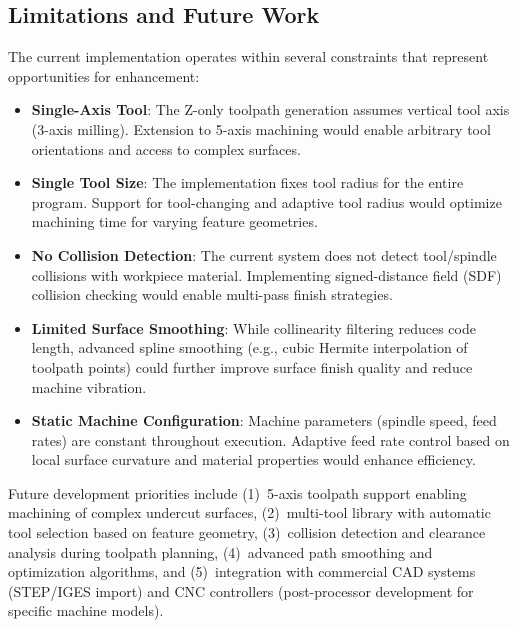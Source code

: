 \documentclass[a4paper,12pt]{article}
\begin{document}
\subsection{Limitations and Future Work}

The current implementation operates within several constraints that represent
opportunities for enhancement:

\begin{itemize}
  \item \textbf{Single-Axis Tool}: The Z-only toolpath generation assumes
    vertical tool axis (3-axis milling). Extension to 5-axis machining would
    enable arbitrary tool orientations and access to complex surfaces.

  \item \textbf{Single Tool Size}: The implementation fixes tool radius for the
    entire program. Support for tool-changing and adaptive tool radius would
    optimize machining time for varying feature geometries.

  \item \textbf{No Collision Detection}: The current system does not detect
    tool/spindle collisions with workpiece material. Implementing signed-distance
    field (SDF) collision checking would enable multi-pass finish strategies.

  \item \textbf{Limited Surface Smoothing}: While collinearity filtering reduces
    code length, advanced spline smoothing (e.g., cubic Hermite interpolation
    of toolpath points) could further improve surface finish quality and reduce
    machine vibration.

  \item \textbf{Static Machine Configuration}: Machine parameters (spindle
    speed, feed rates) are constant throughout execution. Adaptive feed rate
    control based on local surface curvature and material properties would
    enhance efficiency.
\end{itemize}

Future development priorities include (1)~5-axis toolpath support enabling
machining of complex undercut surfaces, (2)~multi-tool library with automatic
tool selection based on feature geometry, (3)~collision detection and clearance
analysis during toolpath planning, (4)~advanced path smoothing and optimization
algorithms, and (5)~integration with commercial CAD systems (STEP/IGES import)
and CNC controllers (post-processor development for specific machine models).
\end{document}
